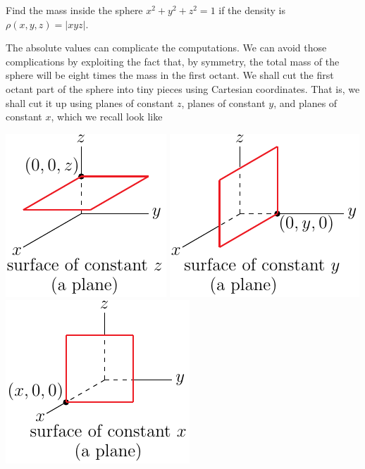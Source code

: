 \begin{eg}\label{eg sphere mass A}
Find the mass inside the sphere $x^2+y^2+z^2=1$ if the density
is $\rho(x,y,z) = |xyz|$.

\soln
The absolute values can complicate the computations. We can avoid
those complications by exploiting the fact that,
by symmetry, the total mass of the sphere will be eight times the mass
in the first octant.
We shall cut the first octant part of the sphere into tiny pieces using 
Cartesian coordinates. That is, we shall cut it up using planes of 
constant $z$, planes of constant $y$, and planes of constant $x$, 
which we recall look like
\begin{wfig}
\begin{center}
    \includegraphics{figures/coord/cart2.pdf}\qquad
    \includegraphics{figures/coord/cart4.pdf}\qquad
    \includegraphics{figures/coord/cart3.pdf}

\end{center}
\end{wfig}
\end{eg}
